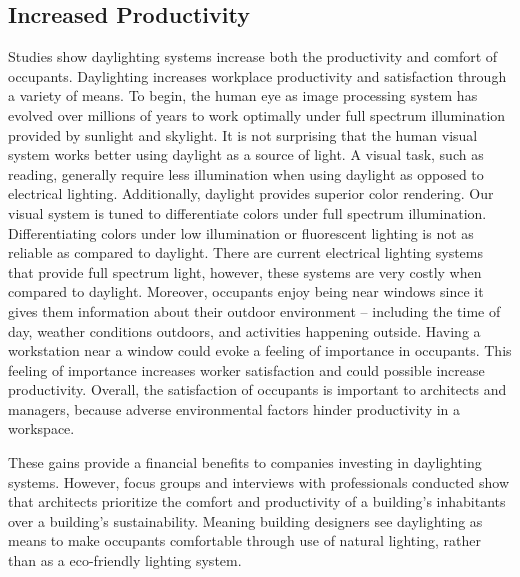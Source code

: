 \subsection{Increased Productivity}
Studies show daylighting systems increase both the productivity and comfort of occupants\cite{Menzies}.  Daylighting increases workplace productivity and satisfaction through a variety of means. To begin, the human eye as image processing system has evolved over millions of years to work optimally under full spectrum illumination provided by sunlight and skylight. It is not surprising that the human visual system works better using daylight as a source of light. A visual task, such as reading, generally require less illumination when using daylight as opposed to electrical lighting\cite{Robbins}. Additionally, daylight provides superior color rendering. Our visual system is tuned to differentiate colors under full spectrum illumination. Differentiating colors under low illumination or fluorescent lighting is not as reliable as compared to daylight\cite{Robbins}. There are current electrical lighting systems that provide full spectrum light, however, these systems are very costly when compared to daylight. Moreover, occupants enjoy being near windows since it gives them information about their outdoor environment -- including the time of day, weather conditions outdoors, and activities happening outside. Having a workstation near a window could evoke a feeling of importance in occupants. This feeling of importance increases worker satisfaction and could possible increase productivity\cite{Leslie}. Overall, the satisfaction of occupants is important to architects and managers, because adverse environmental factors hinder productivity in a workspace.  

These gains provide a financial benefits to companies investing in daylighting systems. However, focus groups and interviews with professionals conducted show that architects prioritize the comfort and productivity of a building’s inhabitants over a building’s sustainability\cite{Menzies}. Meaning building designers see daylighting as means to make occupants comfortable through use of natural lighting, rather than as a eco-friendly lighting system. 

